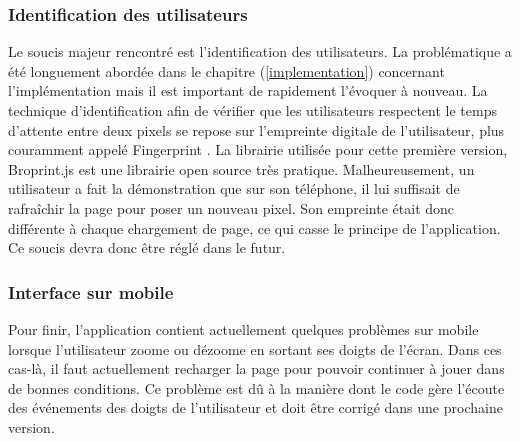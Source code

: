 \subsubsection{Identification des utilisateurs}
Le soucis majeur rencontré est l'identification des utilisateurs. La problématique a été longuement abordée dans le chapitre (\ref{implementation}) concernant l'implémentation mais il est important de rapidement l'évoquer à nouveau. La technique d'identification afin de vérifier que les utilisateurs respectent le temps d'attente entre deux pixels se repose sur l'empreinte digitale de l'utilisateur, plus couramment appelé Fingerprint \cite{devicefingerprint}. La librairie utilisée pour cette première version, Broprint.js \cite{broprintjs} est une librairie open source très pratique. Malheureusement, un utilisateur a fait la démonstration que sur son téléphone, il lui suffisait de rafraîchir la page pour poser un nouveau pixel. Son empreinte était donc différente à chaque chargement de page, ce qui casse le principe de l'application. Ce soucis devra donc être réglé dans le futur.

\subsubsection{Interface sur mobile}
Pour finir, l'application contient actuellement quelques problèmes sur mobile lorsque l'utilisateur zoome ou dézoome en sortant ses doigts de l'écran. Dans ces cas-là, il faut actuellement recharger la page pour pouvoir continuer à jouer dans de bonnes conditions. Ce problème est dû à la manière dont le code gère l'écoute des événements des doigts de l'utilisateur et doit être corrigé dans une prochaine version.
